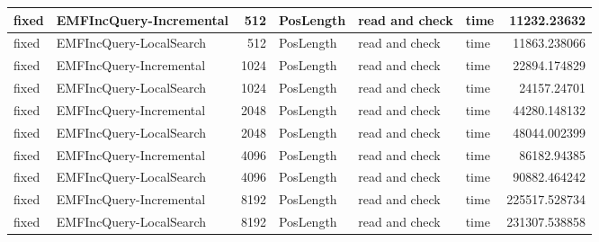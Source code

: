 \begin{table}
\begin{tabular}{| l | l | r | l | l | l | r |}
fixed & EMFIncQuery-Incremental & 512 & PosLength & read and check & time & 11232.23632\\\hline
fixed & EMFIncQuery-LocalSearch & 512 & PosLength & read and check & time & 11863.238066\\\hline
fixed & EMFIncQuery-Incremental & 1024 & PosLength & read and check & time & 22894.174829\\\hline
fixed & EMFIncQuery-LocalSearch & 1024 & PosLength & read and check & time & 24157.24701\\\hline
fixed & EMFIncQuery-Incremental & 2048 & PosLength & read and check & time & 44280.148132\\\hline
fixed & EMFIncQuery-LocalSearch & 2048 & PosLength & read and check & time & 48044.002399\\\hline
fixed & EMFIncQuery-Incremental & 4096 & PosLength & read and check & time & 86182.94385\\\hline
fixed & EMFIncQuery-LocalSearch & 4096 & PosLength & read and check & time & 90882.464242\\\hline
fixed & EMFIncQuery-Incremental & 8192 & PosLength & read and check & time & 225517.528734\\\hline
fixed & EMFIncQuery-LocalSearch & 8192 & PosLength & read and check & time & 231307.538858\\\hline


\end{tabular}
\end{table}
